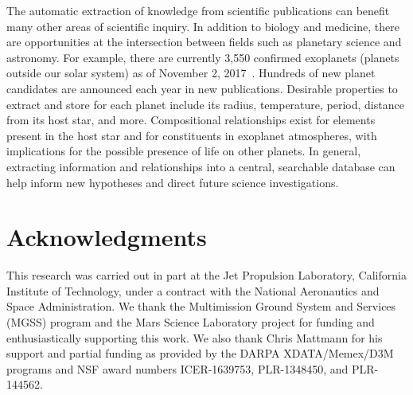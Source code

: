 \documentclass[letterpaper]{article} %
\begin{document}
The automatic extraction of knowledge from scientific publications can
benefit many other areas of scientific inquiry.  In addition to
biology and medicine, there are opportunities at the intersection
between fields such as planetary science and astronomy.  For example,
there are currently 3,550 confirmed exoplanets (planets outside our
solar system) as of November 2, 2017~\cite{ipac:exo}.  Hundreds of new
planet candidates are announced each year in new publications.
Desirable properties to extract and store for each planet include its
radius, temperature, period, distance from its host star, and more.
Compositional relationships exist for elements present in the
host star and for constituents in exoplanet atmospheres, with
implications for the possible presence of life on other planets.
In general, extracting information and relationships into a central,
searchable database can help inform new hypotheses and direct future
science investigations.

\section{Acknowledgments}
This research was carried out in part at the Jet Propulsion Laboratory,
California Institute of Technology, under a contract with the National
Aeronautics and Space Administration.  
We thank the Multimission Ground System and Services (MGSS)
program and the Mars Science Laboratory project for funding and
enthusiastically supporting this work.
We also thank Chris Mattmann for his support and partial funding as
provided by the DARPA XDATA/Memex/D3M programs and NSF award numbers
ICER-1639753, PLR-1348450, and PLR-144562.


\end{document}
